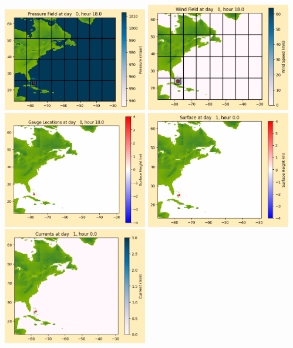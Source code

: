 \documentclass[11pt]{article}
\begin{document}
\includegraphics[width=0.475\textwidth]{frame0015fig1012.png}
\vskip 10pt 
\includegraphics[width=0.475\textwidth]{frame0015fig1013.png}
\includegraphics[width=0.475\textwidth]{frame0015fig1014.png}
\vskip 10pt 
\includegraphics[width=0.475\textwidth]{frame0016fig1001.png}
\includegraphics[width=0.475\textwidth]{frame0016fig1002.png}
\end{document}
